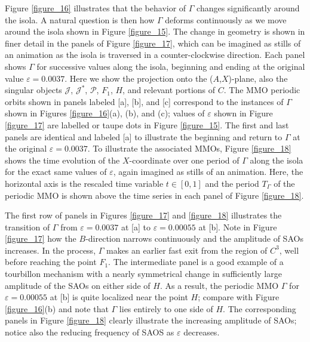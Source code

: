 \documentclass{ws-ijbc}
\begin{document}
Figure \ref{figure_16} illustrates that the behavior of $\Gamma$ changes significantly around the isola.  A natural question is then how $\Gamma$ deforms continuously as we move around the isola shown in Figure \ref{figure_15}.  The change in geometry is shown in finer detail in the panels of Figure \ref{figure_17}, which can be imagined as stills of an animation as the isola is traversed in a counter-clockwise direction.  Each panel shows $\Gamma$ for successive values along the isola, beginning and ending at the original value $\varepsilon=0.0037$.  Here we show the projection onto the ($A$,$X$)-plane, also the singular objects $\mathscr{J}$, $\mathscr{J}^*$, $\mathscr{P}$, $F_1$, $H$, and relevant portions of $C$.  The MMO periodic orbits shown in panels labeled [a], [b], and [c] correspond to the instances of $\Gamma$ shown in Figures \ref{figure_16}(a), (b), and (c); values of $\varepsilon$ shown in Figure \ref{figure_17} are labelled or taupe dots in Figure \ref{figure_15}.  The first and last panels are identical and labeled [a] to illustrate the beginning and return to $\Gamma$ at the original $\varepsilon=0.0037$.  To illustrate the associated MMOs, Figure \ref{figure_18} shows the time evolution of the $X$-coordinate over one period of $\Gamma$ along the isola for the exact same values of $\varepsilon$, again imagined as stills of an animation.  Here, the horizontal axis is the rescaled time variable $t \in [0,1]$ and the period $T_\Gamma$ of the periodic MMO is shown above the time series in each panel of Figure \ref{figure_18}.

The first row of panels in Figures \ref{figure_17} and \ref{figure_18} illustrates the transition of $\Gamma$ from $\varepsilon=0.0037$ at [a] to $\varepsilon=0.00055$ at [b].  Note in Figure \ref{figure_17} how the $B$-direction narrows continuously and the amplitude of SAOs increases.  In the process, $\Gamma$ makes an earlier fast exit from the region of $C^3$, well before reaching the point $F_1$.  The intermediate panel is a good example of a tourbillon mechanism with a nearly symmetrical change in sufficiently large amplitude of the SAOs on either side of $H$.  As a result, the periodic MMO $\Gamma$ for $\varepsilon=0.00055$ at [b] is quite localized near the point $H$; compare with Figure \ref{figure_16}(b) and note that $\Gamma$ lies entirely to one side of $H$.  The corresponding panels in Figure \ref{figure_18} clearly illustrate the increasing amplitude of SAOs; notice also the reducing frequency of SAOS as $\varepsilon$ decreases.
\end{document}
